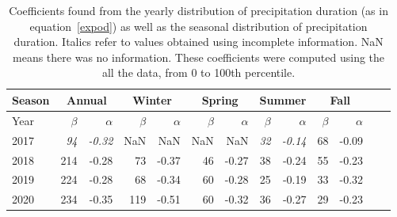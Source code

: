 \begin{table}[bh]
  \begin{center}
    \begin{tabular}{|l|*{11}{r|}r|}
      \hline
      Season    &       \multicolumn{2}{|c|}{Annual}          & \multicolumn{2}{|c|}{Winter}& \multicolumn{2}{|c|}{Spring}  & \multicolumn{2}{|c|}{Summer} &\multicolumn{2}{|c|}{Fall}  \\
      \hline
      Year      & $\beta $ & $\alpha$  & $\beta $ & $\alpha$ & $\beta $ & $\alpha$ & $\beta $ & $\alpha$ & $\beta $ & $\alpha$\\
      \hline
      2017      & \textit{94}  & \textit{-0.32}  & NaN & NaN & NaN & NaN & \textit{32}  & \textit{-0.14}  & 68  & -0.09  \\
      2018      & 214           & -0.28  & 73 & -0.37 & 46 & -0.27 & 38  & -0.24  & 55 & -0.23  \\
      2019      & 224          & -0.28  & 68  & -0.34 & 60 & -0.28 & 25 & -0.19  & 33 &  -0.32 \\
      2020      & 234           & -0.35   & 119  & -0.51 & 60  & -0.32 & 36  & -0.27 & 29 & -0.23\\
      \hline
    \end{tabular}
  \end{center}
\caption[Year comparison of coefficients of precipitation duration up 
  to its 100th percentile]{\label{firsttable_100} Coefficients found from the
  yearly distribution of precipitation duration (as in equation~\ref{expod})
  as well as the seasonal distribution of precipitation duration. Italics
  refer to values obtained using incomplete information. NaN means there was
  no information. These coefficients were computed using the all the data,
  from 0 to 100th percentile.}
\end{table}
